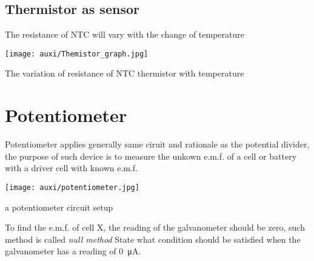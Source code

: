 \documentclass[a4paper]{tufte-handout}
\newenvironment{SummBox}
{\begin{tcolorbox}[breakable,colback=r1!30,colframe=r1,title=Summary]} {\end{tcolorbox}}
\begin{document}
\subsection{Thermistor as sensor}
The resistance of NTC will vary with the change of temperature
\begin{marginfigure}[-2cm]
\texttt{[image: auxi/Themistor\_graph.jpg]}
\caption{The variation of resistance of NTC thermistor with temperature}
\end{marginfigure}

\section{Potentiometer}
Potentiometer applies generally same ciruit and rationale as the potential divider, the purpose of such device is to measure the unkown e.m.f. of a cell or battery with a driver cell with known e.m.f.
\begin{marginfigure}
\centering
\texttt{[image: auxi/potentiometer.jpg]}
\caption{a potentiometer circuit setup}
\end{marginfigure}

\begin{SummBox}
To find the e.m.f. of cell X, the reading of the galvanometer should be zero, such method is called \emph{null method}
State what condition should be satisfied when the galvanometer has a reading of \SI{0}{\micro\ampere}.
\vspace{0.5in}
\end{SummBox}
\end{document}
